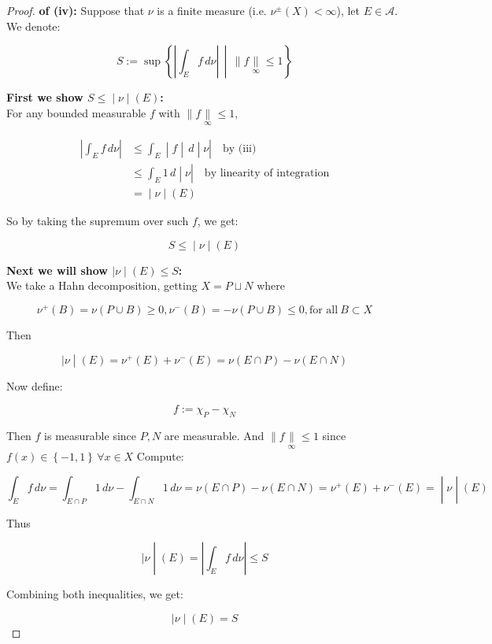\begin{proof}

\textbf{of (iv):} Suppose that \(\nu\) is a finite measure (i.e. \(\nu^{\pm}(X) < \infty\)), let \(E \in \mathcal{A}\).\\
We denote:

\[S := \sup\left\{ \left| {\int_{E}f\, d\nu} \right|\, \middle| \, \parallel f\underset{\infty}{\parallel} \leq 1 \right\}\]

\textbf{First we show \(\left. S \leq \middle| \nu \middle| (E) \right.\):}\\
For any bounded measurable \(f\) with \(\parallel f\underset{\infty}{\parallel} \leq 1\),

\[\begin{matrix}
\left| {\int_{E}f\, d\nu} \right| & {\left. \leq \int_{E} \middle| f \middle| \, d \middle| \nu \right|\quad\text{by (iii)}} \\
 & {\left. \leq \int_{E}1\, d \middle| \nu \right|\quad\text{by linearity of integration}} \\
 & \left. = \middle| \nu \middle| (E) \right.
\end{matrix}\]

So by taking the supremum over such \(f\), we get:

\[\left. S \leq \middle| \nu \middle| (E) \right.\]

\textbf{Next we will show \(\left. |\nu \middle| (E) \leq S \right.\):}\\
We take a Hahn decomposition, getting \(X = P \sqcup N\) where

\[\nu^{+}(B) = \nu(P \cup B) \geq 0,\nu^{-}(B) = - \nu(P \cup B) \leq 0,\text{for all}\ B \subset X\]

Then

\[\left. |\nu \middle| (E) = \nu^{+}(E) + \nu^{-}(E) = \nu(E \cap P) - \nu(E \cap N) \right.\]

Now define:

\[f := \chi_{P} - \chi_{N}\]

Then \(f\) is measurable since \(P,N\) are measurable. And \(\parallel f\underset{\infty}{\parallel} \leq 1\) since \(f(x) \in \left\{ {- 1,1} \right\}\,\forall x \in X\) Compute:

\[\left. \int_{E}f\, d\nu = \int_{E \cap P}1\, d\nu - \int_{E \cap N}1\, d\nu = \nu(E \cap P) - \nu(E \cap N) = \nu^{+}(E) + \nu^{-}(E) = \middle| \nu \middle| (E) \right.\]

Thus

\[\left. |\nu \middle| (E) = \left| {\int_{E}f\, d\nu} \right| \leq S \right.\]

Combining both inequalities, we get:

\[\left. |\nu \middle| (E) = S \right.\]

\end{proof}

